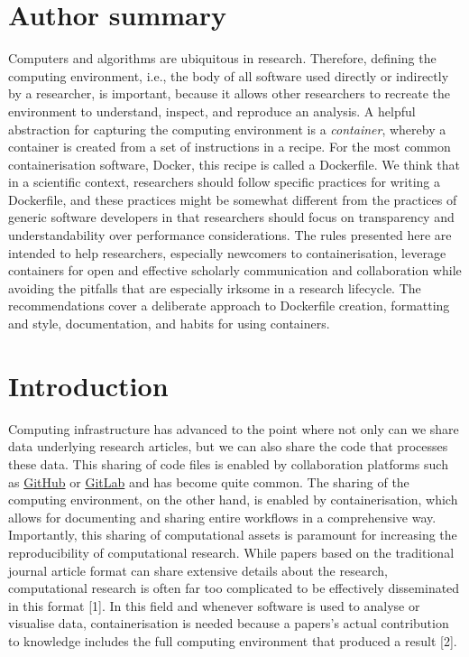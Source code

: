 \documentclass[10pt,letterpaper]{article}
\begin{document}
\section*{Author summary}
Computers and algorithms are ubiquitous in research. Therefore, defining
the computing environment, i.e., the body of all software used directly
or indirectly by a researcher, is important, because it allows other
researchers to recreate the environment to understand, inspect, and
reproduce an analysis. A helpful abstraction for capturing the computing
environment is a \emph{container}, whereby a container is created from a
set of instructions in a recipe. For the most common containerisation
software, Docker, this recipe is called a Dockerfile. We think that in a
scientific context, researchers should follow specific practices for
writing a Dockerfile, and these practices might be somewhat different
from the practices of generic software developers in that researchers
should focus on transparency and understandability over performance
considerations. The rules presented here are intended to help
researchers, especially newcomers to containerisation, leverage
containers for open and effective scholarly communication and
collaboration while avoiding the pitfalls that are especially irksome in
a research lifecycle. The recommendations cover a deliberate approach to
Dockerfile creation, formatting and style, documentation, and habits for
using containers.

\linenumbers

\hypertarget{introduction}{%
\section*{Introduction}\label{introduction}}

Computing infrastructure has advanced to the point where not only can we
share data underlying research articles, but we can also share the code
that processes these data. This sharing of code files is enabled by
collaboration platforms such as \href{https://github.com}{GitHub} or
\href{https://gitlab.com}{GitLab} and has become quite common. The
sharing of the computing environment, on the other hand, is enabled by
containerisation, which allows for documenting and sharing entire
workflows in a comprehensive way. Importantly, this sharing of
computational assets is paramount for increasing the reproducibility of
computational research. While papers based on the traditional journal
article format can share extensive details about the research,
computational research is often far too complicated to be effectively
disseminated in this format {[}1{]}. In this field and whenever software
is used to analyse or visualise data, containerisation is needed because
a papers's actual contribution to knowledge includes the full computing
environment that produced a result {[}2{]}.
\end{document}

